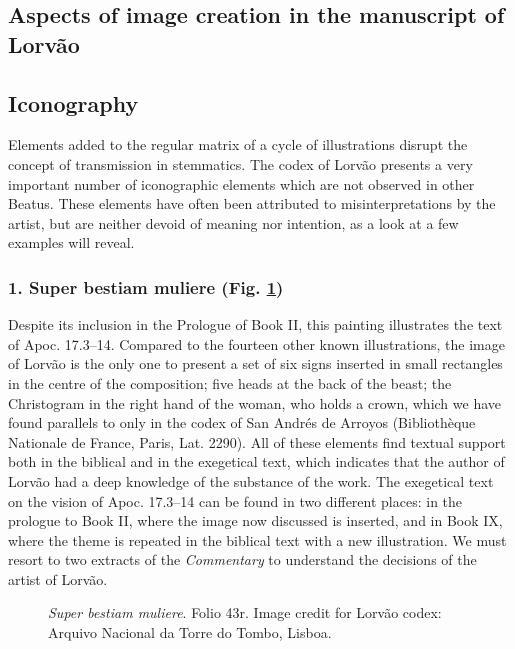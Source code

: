 \begin{paper}
\section*{Aspects of image creation in the manuscript of Lorvão}

\subsection*{Iconography}

Elements added to the regular matrix of a cycle of illustrations disrupt
the concept of transmission in stemmatics. The codex of Lorvão presents
a very important number of iconographic elements which are not observed
in other Beatus. These elements have often been attributed to
misinterpretations by the artist, but are neither devoid of meaning nor
intention, as a look at a few examples will reveal.

\subsubsection{1. Super bestiam muliere (Fig. \ref{fig:rocha:super})} Despite its
inclusion in the Prologue of Book II, this painting illustrates the text
of Apoc. 17.3--14. Compared to the fourteen other known illustrations,
the image of Lorvão is the only one to present a set of six signs
inserted in small rectangles in the centre of the composition; five
heads at the back of the beast; the Christogram in the right hand of the
woman, who holds a crown, which we have found parallels to only in the
codex of San Andrés de Arroyos (Bibliothèque Nationale de France, Paris,
Lat. 2290). All of these elements find textual support both in the
biblical and in the exegetical text, which indicates that the author of
Lorvão had a deep knowledge of the substance of the work. The exegetical
text on the vision of Apoc. 17.3--14 can be found in two different
places: in the prologue to Book II, where the image now discussed is
inserted, and in Book IX, where the theme is repeated in the biblical
text with a new illustration. We must resort to two extracts of the
\emph{Commentary} to understand the decisions of the artist of Lorvão.

\begin{figure}[H]
    \centering
    \caption{\emph{Super bestiam muliere}. Folio 43r. Image credit for Lorvão codex: Arquivo Nacional da Torre do Tombo, Lisboa.}
    \label{fig:rocha:super}
\end{figure}


\end{paper}
